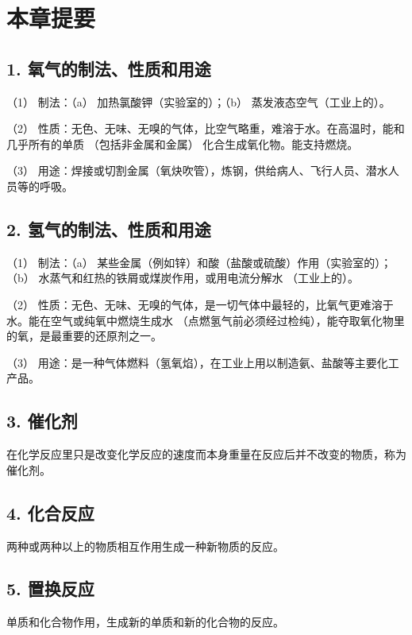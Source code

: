 \section{本章提要}

\subsection{1. 氧气的制法、性质和用途}

（1） 制法：（a） 加热氯酸钾（实验室的）；（b）
蒸发液态空气（工业上的）。

（2）
性质：无色、无味、无嗅的气体，比空气略重，难溶于水。在高温时，能和几乎所有的单质
（包括非金属和金属） 化合生成氧化物。能支持燃烧。

（3）
用途：焊接或切割金属（氧炔吹管），炼钢，供给病人、飞行人员、潜水人员等的呼吸。

\subsection{2. 氢气的制法、性质和用途}

（1） 制法：（a）
某些金属（例如锌）和酸（盐酸或硫酸）作用（实验室的）；（b）
水蒸气和红热的铁屑或煤炭作用，或用电流分解水 （工业上的）。

（2）
性质：无色、无味、无嗅的气体，是一切气体中最轻的，比氧气更难溶于水。能在空气或纯氧中燃烧生成水
（点燃氢气前必须经过检纯），能夺取氧化物里的氧，是最重要的还原剂之一。

（3）
用途：是一种气体燃料（氢氧焰），在工业上用以制造氨、盐酸等主要化工产品。

\subsection{3. 催化剂}

在化学反应里只是改变化学反应的速度而本身重量在反应后并不改变的物质，称为催化剂。

\subsection{4. 化合反应}

两种或两种以上的物质相互作用生成一种新物质的反应。

\subsection{5. 置换反应}

单质和化合物作用，生成新的单质和新的化合物的反应。


